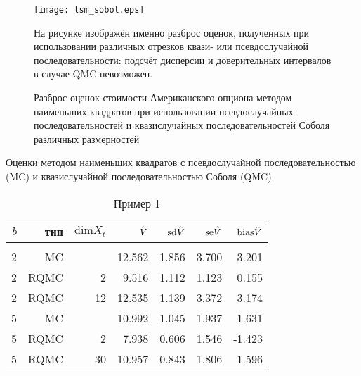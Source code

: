 \begin{figure}[p]
    \begin{center}
    \texttt{[image: lsm\_sobol.eps]}
    \end{center}
    \caption{Разброс оценок стоимости Американского опциона методом наименьших квадратов при использовании псевдослучайных последовательностей и квазислучайных последовательностей Соболя различных размерностей}
    \label{fig:lsm_sobol}

    \linespread{0.8}\footnotesize{На рисунке изображён именно разброс оценок, полученных при использовании различных отрезков квази- или псевдослучайной последовательности: подсчёт дисперсии и доверительных интервалов в случае QMC невозможен.}
\end{figure}

\begin{table}
    \renewcommand{\arraystretch}{0.6}
    \centering
    Оценки методом наименьших квадратов с псевдослучайной последовательностью (MC) и квазислучайной последовательностью Соболя (QMC)
    \caption{Пример 1}\label{tbl:lsm_sobol_ex1}
    \begin{tabular}{rrrrrrr}
        $b$&тип&$\mathrm{dim} X_t$&$\hat{V}$&$\mathrm{sd}\hat{V}$&$\mathrm{se}\hat{V}$&$\mathrm{bias}\hat{V}$\\[3pt]\hline\\[-8pt]
        2&MC&&12.562&1.856&3.700&3.201\\
        2&RQMC&2&9.516&1.112&1.123&0.155\\
        2&RQMC&12&12.535&1.139&3.372&3.174\\[3pt]
        5&MC&&10.992&1.045&1.937&1.631\\
        5&RQMC&2&7.938&0.606&1.546&-1.423\\
        5&RQMC&30&10.957&0.843&1.806&1.596\\[3pt]
    \end{tabular}


\end{table}
